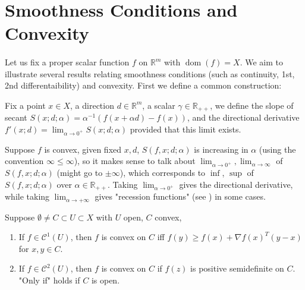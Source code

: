 \section{Smoothness Conditions and Convexity}
\label{sect:022}

\paragraph{}Let us fix a proper scalar function $f$ on $\mathbb{R}^m$ with $\operatorname{dom}(f)=X$. We aim to illustrate several results relating smoothness conditions (such as continuity, 1st, 2nd differentaibility) and convexity. First we define a common construction:

\begin{defn}\label{defn:022-secant-slope}
	Fix a point $x\in X$, a direction $d\in \mathbb{R}^m$, a scalar $\gamma \in \mathbb{R}_{++}$, we define the slope of secant $S(x; d; \alpha)=\alpha^{-1}(f(x+\alpha d)-f(x))$, and the directional derivative $f'(x; d)=\lim_{\alpha \to 0^+}S(x;d; \alpha )$ provided that this limit exists.
\end{defn}

\begin{rmrk}Suppose $f$ is convex, given fixed $x, d$, $S(f,x; d; \alpha)$ is increasing in $\alpha$ (using the convention $\infty\leq \infty$), so it makes sense to talk about $\lim_{\alpha \to0^+},\lim_{\alpha \to\infty}$ of $S(f,x; d; \alpha )$ (might go to $\pm\infty$), which corresponds to $\inf$, $\sup$ of $S(f,x; d; \alpha )$ over $\alpha \in \mathbb{R}_{++}$. Taking $\lim_{\alpha \to 0^+}$ gives the directional derivative, while taking $\lim_{\alpha \to +\infty}$ gives "recession functions" (see ) in some cases.
\end{rmrk}

\begin{prop}
	\label{prop:022-ordered-conditions-convexity}
	Suppose $\emptyset\neq C\subset U\subset X$ with $U$ open, $C$ convex,
	\begin{enumerate}[label=(\alph*)]
		\item If $f\in\mathscr{C}^1(U)$, then $f$ is convex on $C$ iff $f(y)\geq f(x)+\nabla f(x)^T(y-x)$ for $x,y\in C$.
		\item If $f\in\mathscr{C}^2(U)$, then $f$ is convex on $C$ if $f(z)$ is positive semidefinite on $C$. "Only if" holds if $C$ is open.
	\end{enumerate}
\end{prop}

